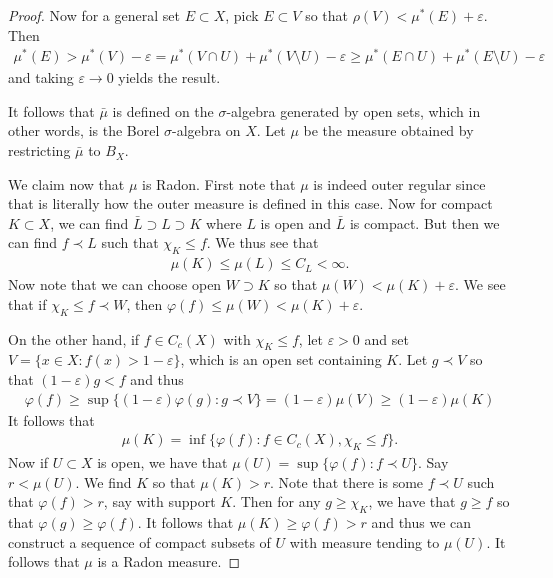 \documentclass[11pt]{amsart}
\theoremstyle{definition}
\numberwithin{equation}{section}
\begin{document}
\begin{proof}
    Now for a general set $E\subset X$, pick $E\subset V$ so that $\rho(V)<\mu^*(E)+\varepsilon$. Then
    \begin{align*}
        \mu^*(E)>\mu^*(V)-\varepsilon=\mu^*(V\cap U)+\mu^*(V\setminus U)-\varepsilon\ge\mu^*(E\cap U)+\mu^*(E\setminus U)-\varepsilon
    \end{align*}
    and taking $\varepsilon\to0$ yields the result.

    It follows that $\bar\mu$ is defined on the $\sigma$-algebra generated by open sets, which in other words, is the Borel $\sigma$-algebra on $X$. Let $\mu$ be the measure obtained by restricting $\bar\mu$ to $B_X$.

    We claim now that $\mu$ is Radon. First note that $\mu$ is indeed outer regular since that is literally how the outer measure is defined in this case. Now for compact $K\subset X$, we can find $\bar L\supset L\supset K$ where $L$ is open and $\bar L$ is compact. But then we can find $f\prec L$ such that $\chi_K\le f$. We thus see that
    \begin{align*}
        \mu(K)\le\mu(L)\le C_L<\infty.
    \end{align*}
    Now note that we can choose open $W\supset K$ so that $\mu(W)<\mu(K)+\varepsilon$. We see that if $\chi_K\le f\prec W$, then $\varphi(f)\le \mu(W)<\mu(K)+\varepsilon$.

    On the other hand, if $f\in C_c(X)$ with $\chi_K\le f$, let $\varepsilon>0$ and set $V=\{x\in X:f(x)>1-\varepsilon\}$, which is an open set containing $K$. Let $g\prec V$ so that $(1-\varepsilon)g<f$ and thus 
    \begin{align*}
        \varphi(f)\ge\sup\{(1-\varepsilon)\varphi(g):g\prec V\}=(1-\varepsilon)\mu(V)\ge(1-\varepsilon)\mu(K)
    \end{align*}
    It follows that
    \begin{align*}
        \mu(K)=\inf\{\varphi(f):f\in C_c(X),\chi_K\le f\}.
    \end{align*}
    Now if $U\subset X$ is open, we have that $\mu(U)=\sup\{\varphi(f):f\prec U\}$. Say $r<\mu(U)$. We find $K$ so that $\mu(K)>r$. Note that there is some $f\prec U$ such that $\varphi(f)>r$, say with support $K$. Then for any $g\ge \chi_K$, we have that $g\ge f$ so that $\varphi(g)\ge \varphi(f)$. It follows that $\mu(K)\ge\varphi(f)>r$ and thus we can construct a sequence of compact subsets of $U$ with measure tending to $\mu(U)$. It follows that $\mu$ is a Radon measure.


\end{proof}
\end{document}
